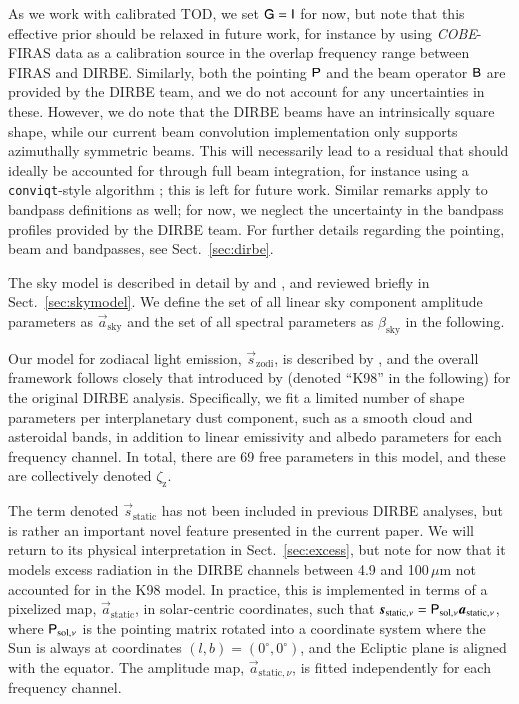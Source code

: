 \documentclass{aa}
\def\COBE{\textit{COBE}}
\newcommand{\B}[0]{\tens{B}}
\newcommand{\G}[0]{\tens{G}}
\newcommand{\s}[0]{\vec{s}}
\renewcommand{\a}[0]{\vec{a}}
\renewcommand{\P}[0]{\tens{P}}
\begin{document}
As we work with calibrated TOD, we set $\G=\tens{I}$ for now, but
note that this effective prior should be relaxed in future work, for
instance by using \COBE-FIRAS data as a calibration source in the
overlap frequency range between FIRAS and DIRBE. Similarly, both the
pointing $\P$ and the beam operator $\B$ are provided by the DIRBE
team, and we do not account for any uncertainties in these. However,
we do note that the DIRBE beams have an intrinsically square shape,
while our current beam convolution implementation only supports
azimuthally symmetric beams. This will necessarily lead to a residual
that should ideally be accounted for through full beam integration,
for instance using a \texttt{conviqt}-style algorithm
\citep{prezeau2010,keihanen2012}; this is left for future
work. Similar remarks apply to bandpass definitions as well; for now,
we neglect the uncertainty in the bandpass profiles provided by the
DIRBE team. For further details regarding the pointing, beam and
bandpasses, see Sect.~\ref{sec:dirbe}.

The sky model is described in detail by \citet{CG02_04} and \citet{CG02_05}, and
reviewed briefly in Sect.~\ref{sec:skymodel}. We define the set of all
linear sky component amplitude parameters as $\a_{\mathrm{sky}}$ and
the set of all spectral parameters as $\beta_{\mathrm{sky}}$ in the
following.

Our model for zodiacal light emission, $\s_{\mathrm{zodi}}$, is
described by \citet{CG02_02}, and the overall framework follows
closely that introduced by \citet{kelsall1998} (denoted ``K98'' in the
following) for the original DIRBE analysis. Specifically, we fit a
limited number of shape parameters per interplanetary dust component,
such as a smooth cloud and asteroidal bands, in addition to linear
emissivity and albedo parameters for each frequency channel. In total,
there are 69 free parameters in this model, and these are collectively
denoted $\zeta_{\mathrm{z}}$.

The term denoted $\s_{\mathrm{static}}$ has not been included in
previous DIRBE analyses, but is rather an important novel feature
presented in the current paper. We will return to its physical
interpretation in Sect.~\ref{sec:excess}, but note for now that it
models excess radiation in the DIRBE channels between 4.9 and
100$\,\mu$m not accounted for in the K98 model. In practice, this is
implemented in terms of a pixelized map, $\a_{\mathrm{static}}$, in
solar-centric coordinates, such that $\s_{\mathrm{static},\nu} =
\P_{\mathrm{sol},\nu}\a_{\mathrm{static},\nu}$, where
$\P_{\mathrm{sol},\nu}$ is the pointing matrix rotated into a
coordinate system where the Sun is always at coordinates
$(l,b)=(0^{\circ},0^{\circ})$, and the Ecliptic plane is aligned with
the equator. The amplitude map, $\a_{\mathrm{static},\nu}$, is fitted
independently for each frequency channel.
\end{document}
